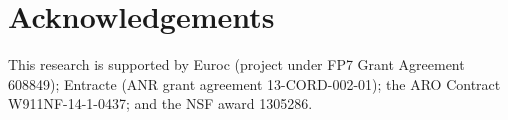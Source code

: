 \documentclass[journal]{IEEEtran}
\begin{document}
\section*{Acknowledgements}
This research is supported by Euroc (project under FP7 Grant Agreement  608849);  Entracte (ANR  grant  agreement  13-CORD-002-01);
the ARO Contract W911NF-14-1-0437; and the NSF award 1305286. %




%



% 









\end{document}
